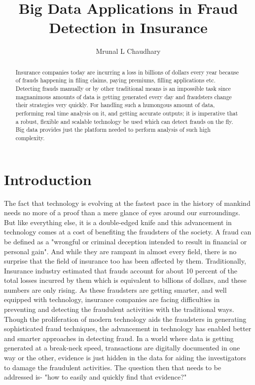 \documentclass[sigconf]{acmart}
\begin{document}
\title{Big Data Applications in Fraud Detection in Insurance}

\author{Mrunal L Chaudhary}

\renewcommand{\shortauthors}{B. Trovato et al.}


\begin{abstract}
Insurance companies today are incurring a loss in billions of dollars every year because of frauds happening in filing claims, paying premiums, filling applications etc. Detecting frauds manually or by other traditional means is an impossible task since magnanimous amounts of data is getting generated every day and fraudsters change their strategies very quickly. For handling such a humongous amount of data, performing real time analysis on it, and getting accurate outputs; it is imperative that a robust, flexible and scalable technology be used which can detect frauds on the fly. Big data provides just the platform needed to perform analysis of such high complexity.
\end{abstract}



\maketitle

\section{Introduction}
The fact that technology is evolving at the fastest pace in the history of mankind needs no more of a proof than a mere glance of eyes around our surroundings. But like everything else, it is a double-edged knife and this advancement in technology comes at a cost of benefiting the fraudsters of the society. A fraud can be defined as a "wrongful or criminal deception intended to result in financial or personal gain". And while they are rampant in almost every field, there is no surprise that the field of insurance too has been affected by them. Traditionally, Insurance industry estimated that frauds account for about 10 percent of the total losses incurred by them which is equivalent to billions of dollars, and these numbers are only rising\cite{link1}. As these fraudsters are getting smarter, and well equipped with technology, insurance companies are facing difficulties in preventing and detecting the fraudulent activities with the traditional ways. Though the proliferation of modern technology aids the fraudsters in generating sophisticated fraud techniques, the advancement in technology has enabled better and smarter approaches in detecting fraud. In a world where data is getting generated at a break-neck speed, transactions are digitally documented in one way or the other, evidence is just hidden in the data for aiding the investigators to damage the fraudulent activities. The question then that needs to be addressed is- "how to easily and quickly find that evidence?"\cite{link4}
\end{document}
